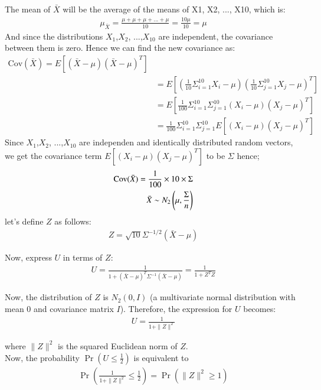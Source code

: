 \documentclass[journal,12pt,onecolumn]{IEEEtran}
\theoremstyle{remark}
\begin{document}
The mean of $\bar{X}$ will be the average of the means of X1, X2, ..., X10, which is:
\begin{align}
    \mu_{\bar{X}} =\frac{\mu + \mu + \mu + ... + \mu}{10} = \frac{10\mu}{10} = \mu   
\end{align}
And since the distributions $X_1$,$X_2$, ...,$X_{10}$ are independent, the covariance between them is zero. Hence we can find 
the new covariance as:\\
\begin{align}
    \text{Cov}(\bar{X}) = E[(\bar{X}-\mu)(\bar{X}-\mu)^T]\\
     &= E[(\frac{1}{10}\Sigma_{i = 1}^{10} X_{i} - \mu)(\frac{1}{10}\Sigma_{j = 1}^{10} X_{j} - \mu)^T] \\
     &= E[\frac{1}{100}\Sigma_{i = 1}^{10}\Sigma_{j = 1}^{10}(X_{i} - \mu)(X_{j} - \mu)^T]\\
     &= \frac{1}{100}\Sigma_{i = 1}^{10}\Sigma_{j = 1}^{10}E[(X_{i} - \mu)(X_{j} - \mu)^T]
\end{align}
Since $X_1$,$X_2$, ...,$X_{10}$ are independen and identically distributed random vectors, we get the covariance term $E[(X_{i} - \mu)(X_{j} - \mu)^T]$
to be $\Sigma$
hence;
\begin{align}
    \text{Cov}(\bar{X}) = \frac{1}{100}\times10\times\Sigma\\
    \bar{X} \sim N_2\left(\mu,\frac{\Sigma}{n}\right)
\end{align}
let's define $Z$ as follows:
\begin{align}
     Z = \sqrt{10}\Sigma^{-1/2}(\bar{X} - \mu)
\end{align}

Now, express $U$ in terms of $Z$:
\begin{align}
    U = \frac{1}{1 + (\bar{X} - \mu)^T \Sigma^{-1} (\bar{X} - \mu)}
    = \frac{1}{1 + Z^T Z}
\end{align}

Now, the distribution of $Z$ is $N_2(0, I)$ (a multivariate normal distribution with mean $0$ and covariance matrix $I$). Therefore, the expression for $U$ becomes:
\begin{align}
    U = \frac{1}{1 + \|Z\|^2}
\end{align}

where $\|Z\|^2$ is the squared Euclidean norm of $Z$.\\

Now, the probability $\Pr(U \leq \frac{1}{2})$ is equivalent to 
\begin{align}
    \Pr\left(\frac{1}{1 + \|Z\|^2} \leq \frac{1}{2}\right)
    = \Pr(\|Z\|^2 \geq 1)
\end{align}
\end{document}
